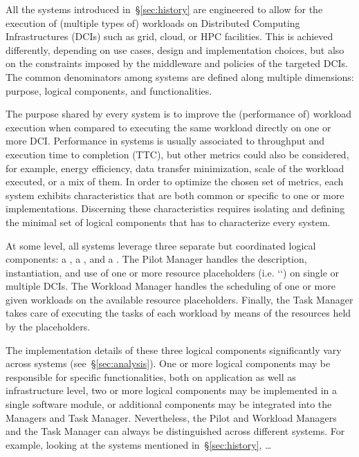 \documentclass{sig-alternate}
\begin{document}
All the \pilot systems introduced in~\S\ref{sec:history} are engineered to
allow for the execution of (multiple types of) workloads on Distributed
Computing Infrastructures (DCIs) such as grid, cloud, or HPC facilities. This
is achieved differently, depending on use cases, design and implementation
choices, but also on the constraints imposed by the middleware and policies of
the targeted DCIs. The common denominators among \pilot systems are defined
along multiple dimensions: purpose, logical components, and functionalities.

The purpose shared by every \pilot system is to improve the (performance of)
workload execution when compared to executing the same workload directly on one
or more DCI. Performance in \pilot systems is usually associated to throughput
and execution time to completion (TTC), but other metrics could also be
considered, for example, energy efficiency, data transfer minimization, scale
of the workload executed, or a mix of them. In order to optimize the chosen set
of metrics, each \pilot system exhibits characteristics that are both common or
specific to one or more implementations. Discerning these characteristics
requires isolating and defining the minimal set of logical components that has
to characterize every \pilot system.

At some level, all \pilot systems leverage three separate but coordinated
logical components: a , a , and a
. The Pilot Manager handles the description, instantiation,
and use of one or more resource placeholders (i.e. `\pilots`) on single or
multiple DCIs. The Workload Manager handles the scheduling of one or more given
workloads on the available resource placeholders. Finally, the Task Manager
takes care of executing the tasks of each workload by means of the resources
held by the placeholders.   

The implementation details of these three logical components significantly vary
across \pilot systems (see~\S\ref{sec:analysis}). One or more logical
components may be responsible for specific functionalities, both on application
as well as infrastructure level, two or more logical components may be
implemented in a single software module, or additional components may be
integrated into the Managers and Task Manager. Nevertheless, the Pilot and
Workload Managers and the Task Manager can always be distinguished across
different \pilot systems. For example, looking at the systems mentioned
in~\S\ref{sec:history}, \ldots {}  
\end{document}
